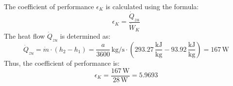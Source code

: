 The coefficient of performance \( \epsilon_K \) is calculated using the formula:  
\[
\epsilon_K = \frac{\dot{Q}_{zu}}{\dot{W}_K}
\]  
The heat flow \( \dot{Q}_{zu} \) is determined as:  
\[
\dot{Q}_{zu} = \dot{m} \cdot (h_2 - h_1) = \frac{a}{3600} \, \text{kg/s} \cdot \left( 293.27 \, \frac{\text{kJ}}{\text{kg}} - 93.92 \, \frac{\text{kJ}}{\text{kg}} \right) = 167 \, \text{W}
\]  
Thus, the coefficient of performance is:  
\[
\epsilon_K = \frac{167 \, \text{W}}{28 \, \text{W}} = 5.9693
\]